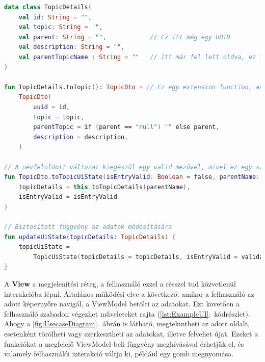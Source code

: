 \begin{lstlisting}[caption={Példa a DTO átalakítására a valós UI-n használt modellé és egy példa logikát leíró függvényre. Az eredeti DTO: \ref{lst:Model}.~kódrészlet}, label={lst:TransformationAndFunction}, language=Kotlin]
data class TopicDetails(
    val id: String = "",
    val topic: String = "",
    val parent: String = "",            // Ez itt még egy UUID
    val description: String = "",
    val parentTopicName : String = ""   // Itt már fel lett oldva, ez fog a UI-on megjelenni
)

fun TopicDetails.toTopic(): TopicDto = // Ez egy extension function, ami visszaalakítja a UI-n megjelenő adatot a REST API által kezelhető formára
    TopicDto(
        uuid = id,
        topic = topic,
        parentTopic = if (parent == "null") "" else parent,
        description = description,
    )

// A névfeloldott változat kiegészül egy valid mezővel, mivel ez egy szerkeszthető nézethez tartozó modell lesz
fun TopicDto.toTopicUiState(isEntryValid: Boolean = false, parentName: String): TopicUiState = TopicUiState(
    topicDetails = this.toTopicDetails(parentName),
    isEntryValid = isEntryValid
)

// Biztosított függvény az adatok módosítására
fun updateUiState(topicDetails: TopicDetails) {
    topicUiState =
        TopicUiState(topicDetails = topicDetails, isEntryValid = validateInput(topicDetails))
}
\end{lstlisting}



A \textbf{View} a megjelenítési réteg, a felhasználó ezzel a résszel tud közvetlenül interakcióba lépni.  
Általános működési elve a következő: amikor a felhasználó az adott képernyőre navigál, a ViewModel betölti az adatokat.  
Ezt követően a felhasználó szabadon végezhet műveleteket rajta (\ref{lst:ExampleUI}.~kódrészlet). Ahogy a \ref{fig:UsecaseDiagram}.~ábrán is látható, megtekintheti az adott oldalt, esetenként törölheti vagy szerkesztheti az adatokat, illetve felvehet újat.  
Ezeket a funkciókat a megfelelő ViewModel-beli függvény meghívásával érhetjük el, és valamely felhasználói interakció váltja ki, például egy gomb megnyomása.  

